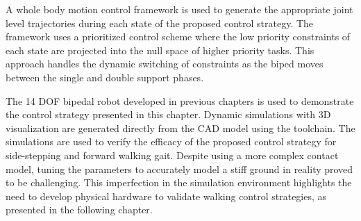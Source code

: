 A whole body motion control framework is used to generate the appropriate joint level trajectories during each state of the proposed control strategy. The framework uses a prioritized control scheme where the low priority constraints of each state are projected into the null space of higher priority tasks. This approach handles the dynamic switching of constraints as the biped moves between the single and double support phases. 

The 14 DOF bipedal robot developed in previous chapters is used to demonstrate the control strategy presented in this chapter. Dynamic simulations with 3D visualization are generated directly from the CAD model using the toolchain. The simulations are used to verify the efficacy of the proposed control strategy for side-stepping and forward walking gait. Despite using a more complex contact model, tuning the parameters to accurately model a stiff ground in reality proved to be challenging. This imperfection in the simulation environment highlights the need to develop physical hardware to validate walking control strategies, as presented in the following chapter.

